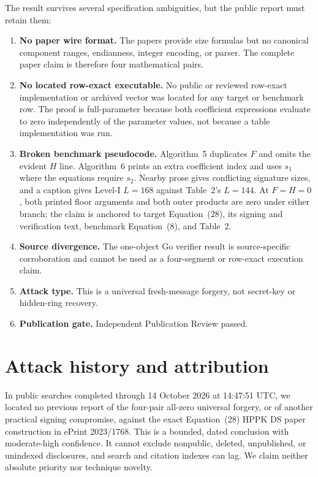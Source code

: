 \documentclass[10pt,a4paper]{article}
\begin{document}
The result survives several specification ambiguities, but the public report
must retain them:
\begin{enumerate}
  \item \textbf{No paper wire format.} The papers provide size formulas but no
        canonical component ranges, endianness, integer encoding, or parser.
        The complete paper claim is therefore four mathematical pairs.
  \item \textbf{No located row-exact executable.} No public or reviewed
        row-exact implementation or archived vector was located for any target
        or benchmark row. The proof is full-parameter because both coefficient
        expressions evaluate to zero independently of the parameter values,
        not because a table implementation was run.
  \item \textbf{Broken benchmark pseudocode.} Algorithm~5 duplicates $F$ and
        omits the evident $H$ line. Algorithm~6 prints an extra coefficient
        index and uses $s_1$ where the equations require $s_2$. Nearby prose
        gives conflicting signature sizes, and a caption gives Level-I
        $L=168$ against Table~2's $L=144$. At $F=H=0$, both printed floor
        arguments and both outer products are zero under either branch; the
        claim is anchored to target Equation~(28), its signing and verification
        text, benchmark Equation~(8), and Table~2.
  \item \textbf{Source divergence.} The one-object Go verifier result is
        source-specific corroboration and cannot be used as a four-segment or
        row-exact execution claim.
  \item \textbf{Attack type.} This is a universal fresh-message forgery, not
        secret-key or hidden-ring recovery.
  \item \textbf{Publication gate.} Independent Publication Review passed.
\end{enumerate}

\section{Attack history and attribution}

In public searches completed through 14 October 2026 at 14:47:51 UTC, we
located no previous report of the four-pair all-zero universal forgery, or of
another practical signing compromise, against the exact Equation~(28) HPPK DS
paper construction in ePrint 2023/1768. This is a bounded, dated conclusion
with moderate-high confidence. It cannot exclude nonpublic, deleted,
unpublished, or unindexed disclosures, and search and citation indexes can
lag. We claim neither absolute priority nor technique novelty.
\end{document}
